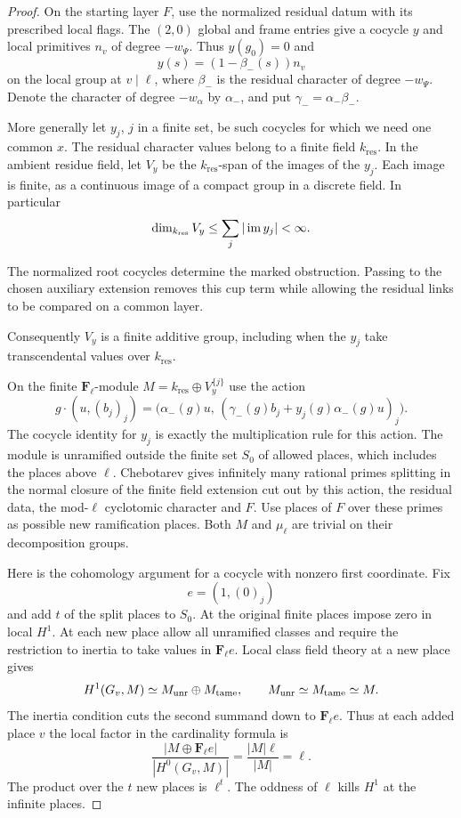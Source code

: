 \begin{proof}

On the starting layer \(F\), use the normalized residual
datum with its prescribed local flags. The \((2,0)\)
global and frame entries give a cocycle \(y\) and local
primitives \(n_v\) of degree \(-w_\Psi\).
Thus \(y(g_0)=0\) and
\[
 y(s)=(1-\beta_-(s))n_v
\]
on the local group at \(v\mid\ell\),
where \(\beta_-\) is the residual character of degree
\(-w_\Psi\). Denote the character of degree \(-w_\alpha\)
by \(\alpha_-\), and put \(\gamma_-=\alpha_-\beta_-\).

More generally let \(y_j\), \(j\) in a finite set, be
such cocycles for which we need one common \(x\).
The residual character values belong to a finite field
\(k_{\mathrm{res}}\). In the ambient residue field,
let \(V_y\) be the \(k_{\mathrm{res}}\)-span of the images of the
\(y_j\). Each image is finite, as a continuous image of a compact group in a discrete field. In particular
\[
 \dim_{k_{\rm res}}V_y\le\sum_j|\operatorname{im}y_j|<\infty .
\]

The normalized root cocycles determine the marked obstruction. Passing to the chosen auxiliary extension removes this cup term while allowing the residual links to be compared on a common layer.


Consequently \(V_y\) is a finite additive group, including
when the \(y_j\) take transcendental values over \(k_{\mathrm{res}}\).

On the finite \(\mathbf F_\ell\)-module
\(M=k_{\mathrm{res}}\oplus V_y^{\{j\}}\) use the action
\[
 g\cdot(u,(b_j)_j)
   =\bigl(\alpha_-(g)u,\,
      (\gamma_-(g)b_j+y_j(g)\alpha_-(g)u)_j\bigr).
\]
The cocycle identity for \(y_j\) is exactly the
multiplication rule for this action. The module is
unramified outside the finite set \(S_0\) of allowed
places, which includes the places above \(\ell\).
Chebotarev gives infinitely many rational primes
splitting in the normal closure of the finite field
extension cut out by this action, the residual data,
the mod-\(\ell\) cyclotomic character and \(F\). Use
places of \(F\) over these primes as possible new
ramification places. Both \(M\) and \(\mu_\ell\) are
trivial on their decomposition groups.

Here is the cohomology argument for a cocycle with
nonzero first coordinate. Fix
\[
 e=(1,(0)_j)
\]
and add
\(t\) of the split places to \(S_0\). At the original
finite places impose zero in local \(H^1\). At each
new place allow all unramified classes and require
the restriction to inertia to take values in
\(\mathbf F_\ell e\). Local class field theory at a new place gives
\[
 H^1(G_v,M)\simeq M_{\rm unr}\oplus M_{\rm tame},\qquad M_{\rm unr}\simeq M_{\rm tame}\simeq M.
\]
The inertia condition cuts the second summand down to \(\mathbf F_\ell e\). Thus at each added place \(v\) the local factor in the cardinality formula is
\[
 \frac{|M\oplus\mathbf F_\ell e|}{|H^0(G_v,M)|}
   =\frac{|M|\ell}{|M|}=\ell .
\]
The product over the \(t\) new places is \(\ell^t\). The oddness of \(\ell\)
kills \(H^1\) at the infinite places.


\end{proof}
